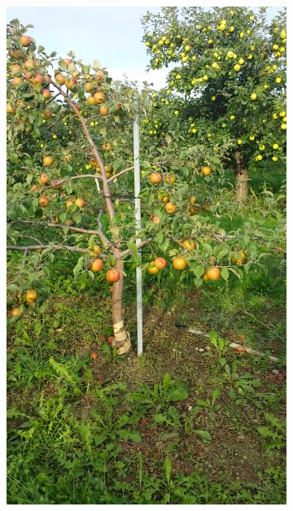 \begin{figure}[!htb]
\begin{subfigure}[b]{0.18\textwidth}
    \includegraphics[width=\textwidth]{figures/detection/training3.png}%
    \end{subfigure}\hspace{.2cm} \begin{subfigure}[b]{0.18\textwidth}

\end{subfigure}
\end{figure}
